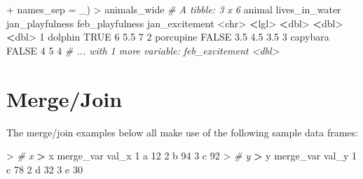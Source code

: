 \documentclass[
]{book}
\newenvironment{Shaded}{\begin{snugshade}}{\end{snugshade}}
\newcommand{\AttributeTok}[1]{\textcolor[rgb]{0.77,0.63,0.00}{#1}}
\newcommand{\CommentTok}[1]{\textcolor[rgb]{0.56,0.35,0.01}{\textit{#1}}}
\newcommand{\ConstantTok}[1]{\textcolor[rgb]{0.00,0.00,0.00}{#1}}
\newcommand{\DecValTok}[1]{\textcolor[rgb]{0.00,0.00,0.81}{#1}}
\newcommand{\ErrorTok}[1]{\textcolor[rgb]{0.64,0.00,0.00}{\textbf{#1}}}
\newcommand{\FloatTok}[1]{\textcolor[rgb]{0.00,0.00,0.81}{#1}}
\newcommand{\NormalTok}[1]{#1}
\newcommand{\SpecialCharTok}[1]{\textcolor[rgb]{0.00,0.00,0.00}{#1}}
\newcommand{\StringTok}[1]{\textcolor[rgb]{0.31,0.60,0.02}{#1}}
\begin{document}
\begin{Shaded}
\begin{Highlighting}[]
\SpecialCharTok{+}                             \AttributeTok{names\_sep =} \StringTok{\textquotesingle{}\_\textquotesingle{}}\NormalTok{)}
\SpecialCharTok{\textgreater{}}\NormalTok{ animals\_wide}
\CommentTok{\# A tibble: 3 x 6}
\NormalTok{  animal    lives\_in\_water jan\_playfulness feb\_playfulness jan\_excitement}
  \SpecialCharTok{\textless{}}\NormalTok{chr}\SpecialCharTok{\textgreater{}}     \ErrorTok{\textless{}}\NormalTok{lgl}\SpecialCharTok{\textgreater{}}                    \ErrorTok{\textless{}}\NormalTok{dbl}\SpecialCharTok{\textgreater{}}           \ErrorTok{\textless{}}\NormalTok{dbl}\SpecialCharTok{\textgreater{}}          \ErrorTok{\textless{}}\NormalTok{dbl}\SpecialCharTok{\textgreater{}}
\DecValTok{1}\NormalTok{ dolphin   }\ConstantTok{TRUE}                       \DecValTok{6}               \FloatTok{5.5}            \DecValTok{7}  
\DecValTok{2}\NormalTok{ porcupine }\ConstantTok{FALSE}                      \FloatTok{3.5}             \FloatTok{4.5}            \FloatTok{3.5}
\DecValTok{3}\NormalTok{ capybara  }\ConstantTok{FALSE}                      \DecValTok{4}               \DecValTok{5}              \DecValTok{4}  
\CommentTok{\# ... with 1 more variable: feb\_excitement \textless{}dbl\textgreater{}}
\end{Highlighting}
\end{Shaded}

\hypertarget{mergejoin}{%
\section{Merge/Join}\label{mergejoin}}

The merge/join examples below all make use of the following sample data frames:

\begin{Shaded}
\begin{Highlighting}[]
\SpecialCharTok{\textgreater{}} \CommentTok{\# x}
\ErrorTok{\textgreater{}}\NormalTok{ x}
\NormalTok{  merge\_var val\_x}
\DecValTok{1}\NormalTok{         a    }\DecValTok{12}
\DecValTok{2}\NormalTok{         b    }\DecValTok{94}
\DecValTok{3}\NormalTok{         c    }\DecValTok{92}
\SpecialCharTok{\textgreater{}} \CommentTok{\# y}
\ErrorTok{\textgreater{}}\NormalTok{ y}
\NormalTok{  merge\_var val\_y}
\DecValTok{1}\NormalTok{         c    }\DecValTok{78}
\DecValTok{2}\NormalTok{         d    }\DecValTok{32}
\DecValTok{3}\NormalTok{         e    }\DecValTok{30}
\end{Highlighting}
\end{Shaded}
\end{document}

